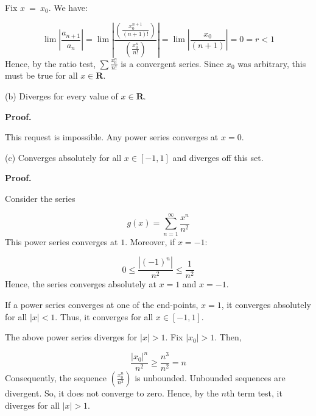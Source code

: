 \documentclass[10pt]{article}
\begin{document}
Fix $\displaystyle x\ =\ x_{0}$. We have:


\begin{equation*}
\lim \left| \frac{a_{n+1}}{a_{n}}\right| =\lim \left| \frac{\left(\frac{x_{0}^{n+1}}{( n+1) !}\right)}{\left(\frac{x_{0}^{n}}{n!}\right)}\right| =\lim \left| \frac{x_{0}}{( n+1)}\right| =0=r< 1
\end{equation*}
Hence, by the ratio test, $\displaystyle \sum \frac{x_{0}^{n}}{n!}$ is a convergent series. Since $\displaystyle x_{0}$ was arbitrary, this must be true for all $\displaystyle x\in \mathbf{R}$.



(b) Diverges for every value of $\displaystyle x\in \mathbf{R}$.



\textbf{Proof.}



This request is impossible. Any power series converges at $\displaystyle x=0$. 



(c) Converges absolutely for all $\displaystyle x\in [ -1,1]$ and diverges off this set.



\textbf{Proof.}



Consider the series 


\begin{equation*}
g( x) =\sum _{n=1}^{\infty }\frac{x^{n}}{n^{2}}
\end{equation*}
This power series converges at $\displaystyle 1$. Moreover, if $\displaystyle x=-1$:


\begin{equation*}
0\leq \frac{|( -1)^{n} |}{n^{2}} \leq \frac{1}{n^{2}}
\end{equation*}
Hence, the series converges absolutely at $\displaystyle x=1$ and $\displaystyle x=-1$.



If a power series converges at one of the end-points, $\displaystyle x=1$, it converges absolutely for all $\displaystyle |x|< 1$. Thus, it converges for all $\displaystyle x\in [ -1,1]$. 



The above power series diverges for $\displaystyle |x| >1$. Fix $\displaystyle |x_{0} | >1$. Then,


\begin{equation*}
\frac{|x_{0} |^{n}}{n^{2}} \geq \frac{n^{3}}{n^{2}} =n
\end{equation*}
Consequently, the sequence $\displaystyle \left(\frac{x_{0}^{n}}{n^{2}}\right)$ is unbounded. Unbounded sequences are divergent. So, it does not converge to zero. Hence, by the $\displaystyle n$th term test, it diverges for all $\displaystyle |x| >1$.
\end{document}
